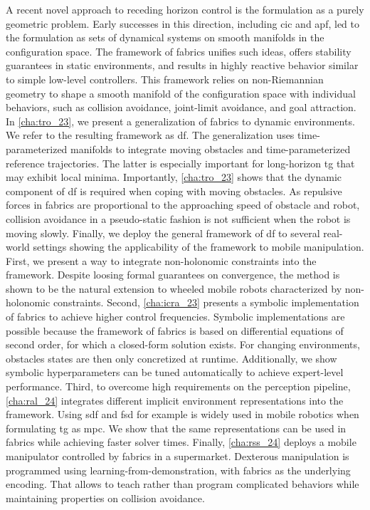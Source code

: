 A recent novel approach to
receding horizon control is the formulation as a purely geometric problem.
Early successes in this direction, including \ac{cic} and \ac{apf}, led to the
formulation as sets of dynamical systems on smooth manifolds in the
configuration space. The framework of \acf{fabrics} unifies such ideas, 
offers stability guarantees in static environments, and results in highly
reactive behavior similar to simple low-level controllers.
This framework relies on non-Riemannian
geometry to shape a smooth manifold of the configuration space with individual
behaviors, such as collision avoidance, joint-limit avoidance, and goal 
attraction. In \cref{cha:tro_23}, we present a generalization of
\ac{fabrics} to dynamic environments. We refer to the resulting framework as
\ac{df}. The generalization uses time\hyp{}parameterized manifolds to integrate 
moving obstacles and time\hyp{}parameterized reference trajectories. The latter is
especially important for long-horizon \ac{tg} that may exhibit local minima.
Importantly, \cref{cha:tro_23} shows that the dynamic component of \ac{df}
is required when coping with moving obstacles. As repulsive forces 
in \ac{fabrics} are proportional to the approaching speed of obstacle and robot,
collision avoidance in a pseudo-static fashion is not sufficient when the robot
is moving slowly.
Finally, we deploy the general framework of \ac{df} to several real-world
settings showing the applicability of the framework to mobile manipulation.
First, we present a way to
integrate non\hyp{}holonomic constraints into the framework. Despite loosing
formal guarantees on convergence, the method is shown to be the natural extension
to wheeled mobile robots characterized by non\hyp{}holonomic constraints.
Second, \cref{cha:icra_23} presents a symbolic
implementation of \ac{fabrics} to achieve higher control frequencies.
Symbolic implementations are possible because the framework of \ac{fabrics}
is based on differential equations of second order, for which a closed-form
solution exists. For changing environments, obstacles states are then only
concretized at runtime.
Additionally, we show symbolic 
hyperparameters can be tuned automatically to achieve expert-level performance.
Third, to overcome high requirements on the perception pipeline, \cref{cha:ral_24}
integrates different implicit environment representations into the framework.
Using \acf{sdf} and \acf{fsd} for example is widely used in mobile robotics when
formulating \ac{tg} as \ac{mpc}. We show that the same representations can be
used in \ac{fabrics} while achieving faster solver times.
Finally, 
\cref{cha:rss_24} deploys a mobile manipulator controlled by \ac{fabrics}
in a supermarket. Dexterous manipulation is programmed using
learning-from-demonstration, with \ac{fabrics} as the underlying encoding.
That allows to teach rather than program complicated behaviors while
maintaining properties on collision avoidance.

